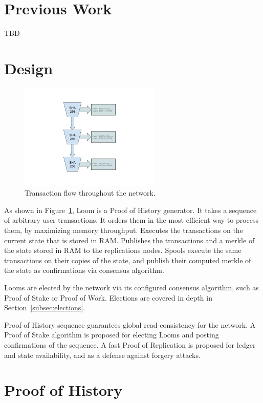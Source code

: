 \documentclass[12pt]{article}
\begin{document}
\section{Previous Work}\label{previous work}
TBD
\section{Design}\label{design}

\begin{figure}
  \begin{center}
    \centering
    \includegraphics[width=0.6\textwidth]{figures/fig_1.png}
    \caption[Fig 1]{Transaction flow throughout the network.\label{fig:design}}
  \end{center}
  \end{figure}

As shown in Figure~\ref{fig:design}, Loom is a Proof of History generator.  It takes a sequence of arbitrary user transactions.  It orders them in the most efficient way to process them, by maximizing memory throughput.  Executes the transactions on the current state that is stored in RAM.  Publishes the transactions and a merkle of the state stored in RAM to the replications nodes.  Spools execute the same transactions on their copies of the state, and publish their computed merkle of the state as confirmations via consensus algorithm.

Looms are elected by the network via its configured consensus algorithm, such as Proof of Stake or Proof of Work.  Elections are covered in depth in Section~\ref{subsec:elections}.

Proof of History sequence guarantees global read consistency for the network.  A Proof of Stake algorithm is proposed for electing Looms and posting confirmations of the sequence.  A fast Proof of Replication is proposed for ledger and state availability, and as a defense against forgery attacks.

\section{Proof of History}\label{proof_of_history}
\end{document}
